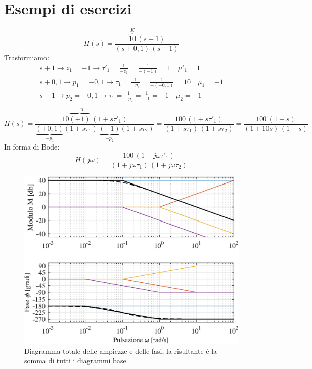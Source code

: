 \section{Esempi di esercizi}
\begin{nexample}
	\[ H(s) = \frac{\overbrace{10}^{K} \, (s+1)}{(s+0,1)\,(s-1)} \]
	Trasformiamo:
	\begin{gather*}
		s+1\rightarrow z_1 =-1\rightarrow\tau'_1 = \frac{1}{-z_1}= \frac{1}{-(-1)}=1 \quad \mu'_1 = 1 \\
		s+0,1\rightarrow p_1 =-0,1\rightarrow\tau_1 = \frac{1}{-p_1} = \frac{1}{-(-0,1)}=10 \quad \mu_1 = -1 \\
		s-1\rightarrow p_2 =-0,1\rightarrow\tau_1 = \frac{1}{-p_2}= \frac{1}{-1}=-1 \quad \mu_2 = -1 \\
	\end{gather*}
	\[
		H(s) = \frac{10\overbrace{(+1)}^{-z_1} \, (1+s\tau'_1)}{\underbrace{(+0,1)}_{-p_1}(1+s\tau_1)\,\underbrace{(-1)}_{-p_2}(1+s\tau_2)} =
		\frac{100 \, (1+s\tau'_1)}{(1+s\tau_1)\,(1+s\tau_2)} = 
		\frac{100 \, (1+s)}{(1+10s)\,(1-s)} 
	\]
	In forma di Bode:
	\[  H(j\omega) = \frac{100 \, (1+j\omega\tau'_1)}{(1+j\omega\tau_1)\,(1+j\omega\tau_2)}\]
	

\begin{figure}[H]
	\centering
	\includegraphics[width=0.7\linewidth]{immagini/cap6_Bode/es5.eps}
	\caption{Diagramma totale delle ampiezze e delle fasi, la risultante è la somma di tutti i diagrammi base}
	\label{fig:es5}
\end{figure}

\end{nexample}






